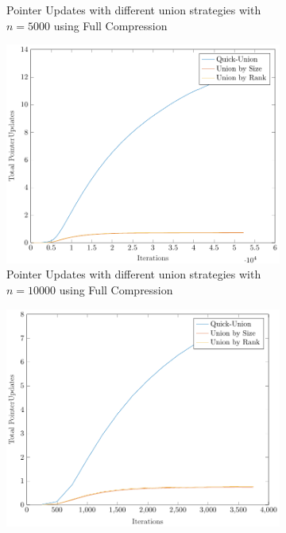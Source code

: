 \begin{figure}[ht]
\begin{subfigure}{0.32\textwidth}
        \caption{Pointer Updates with different union strategies with $n = 5000$ using Full Compression}
    \end{subfigure}%
    \hfill
    \begin{subfigure}{0.32\textwidth}
        \centering
        \includegraphics[width=\textwidth]{../images/plotFCFull10000_PointerUpdates.pdf}
        \caption{Pointer Updates with different union strategies with $n = 10000$ using Full Compression}
    \end{subfigure}
    \begin{subfigure}{0.32\textwidth}
        \centering
        \includegraphics[width=\textwidth]{../images/plotPSFull1000_PointerUpdates.pdf}

\end{subfigure}
\end{figure}
